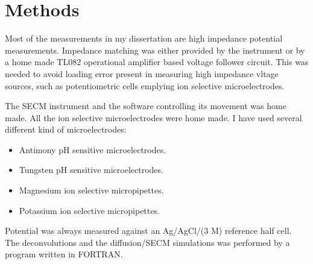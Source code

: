 \section{Methods}
Most of the measurements in my dissertation are high impedance potential measurements. Impedance matching was either provided by the instrument or by a home made TL082 operational amplifier based voltage follower circuit. This was needed to avoid loading error present in measuring high impedance vltage sources, such as potentiometric cells emplying ion selective microelectrodes.

The SECM instrument and the software controlling its movement was home made. All the ion selective microelectrodes were home made. I have used several different kind of microelectrodes:

\begin{itemize}
\item Antimony pH sensitive microelectrodes.
\item Tungsten pH sensitive microelectrodes.
\item Magnesium ion selective micropipettes.
\item Potassium ion selective micropipettes.
\end{itemize}

Potential was always measured against an Ag/AgCl/(3 M) reference half cell. The deconvolutions and the diffusion/SECM simulations was performed by a program written in FORTRAN.
